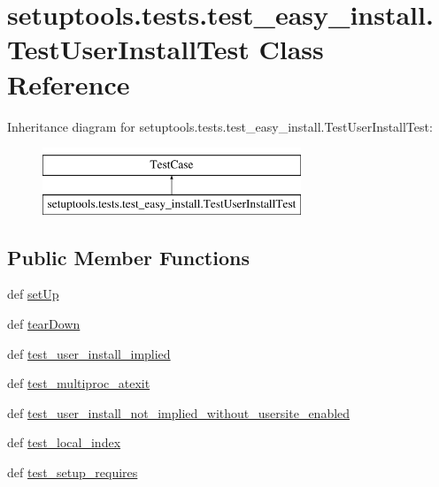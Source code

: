 \hypertarget{classsetuptools_1_1tests_1_1test__easy__install_1_1TestUserInstallTest}{}\section{setuptools.\+tests.\+test\+\_\+easy\+\_\+install.\+Test\+User\+Install\+Test Class Reference}
\label{classsetuptools_1_1tests_1_1test__easy__install_1_1TestUserInstallTest}
Inheritance diagram for setuptools.\+tests.\+test\+\_\+easy\+\_\+install.\+Test\+User\+Install\+Test\+:\begin{figure}[H]
\begin{center}
\leavevmode
\includegraphics[height=2.000000cm]{classsetuptools_1_1tests_1_1test__easy__install_1_1TestUserInstallTest}
\end{center}
\end{figure}
\subsection*{Public Member Functions}
\begin{DoxyCompactItemize}
\item 
def \hyperlink{classsetuptools_1_1tests_1_1test__easy__install_1_1TestUserInstallTest_a7614157c89aa4190561c6e7c3cf20b61}{set\+Up}
\item 
def \hyperlink{classsetuptools_1_1tests_1_1test__easy__install_1_1TestUserInstallTest_a5d253b3d2030b094307216fec66f15b9}{tear\+Down}
\item 
def \hyperlink{classsetuptools_1_1tests_1_1test__easy__install_1_1TestUserInstallTest_aed391a9b2bea9e83715c02870a2d0d28}{test\+\_\+user\+\_\+install\+\_\+implied}
\item 
def \hyperlink{classsetuptools_1_1tests_1_1test__easy__install_1_1TestUserInstallTest_a8ba63a05ccee0838bfc73a18ee682aa2}{test\+\_\+multiproc\+\_\+atexit}
\item 
def \hyperlink{classsetuptools_1_1tests_1_1test__easy__install_1_1TestUserInstallTest_aeae65dc8defbf69533ed2d1b0e72b7ac}{test\+\_\+user\+\_\+install\+\_\+not\+\_\+implied\+\_\+without\+\_\+usersite\+\_\+enabled}
\item 
def \hyperlink{classsetuptools_1_1tests_1_1test__easy__install_1_1TestUserInstallTest_ac58d4f565a1885d179d694a13c6c80fe}{test\+\_\+local\+\_\+index}
\item 
def \hyperlink{classsetuptools_1_1tests_1_1test__easy__install_1_1TestUserInstallTest_a05d598a433b49df6df433c40ca767cab}{test\+\_\+setup\+\_\+requires}
\end{DoxyCompactItemize}
